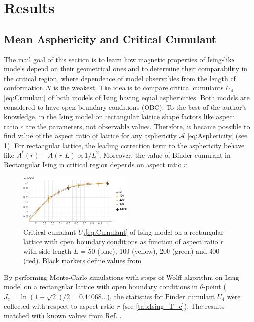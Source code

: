 \section{Results}

\subsection{Mean Asphericity and Critical Cumulant}

The mail goal of this section is to learn how magnetic properties of Ising-like models depend on their geometrical ones and to determine their comparability in the critical region, where dependence of model observables from the length of conformation $N$ is the weakest. 
The idea is to compare critical cumulants $U_{4}$ \eqref{eq:Cumulant} of both models of Ising having equal asphericities. 
Both models are considered to have open boundary conditions (OBC). 
To the best of the author’s knowledge, in the Ising model on rectangular lattice shape factors like aspect ratio $r$ are the parameters, not observable values. 
Therefore, it became possible to find value of the aspect ratio of lattice for any asphericity $\mathcal{A}$ \eqref{eq:Asphericity} (see \cref{fig:A_r}). 
For rectangular lattice, the leading correction term to the asphericity behave like $A^{*}(r) - A(r, L) \propto 1 / L^{2}$. 
Moreover, the value of Binder cumulant in Rectangular Ising in critical region depends on aspect ratio $r$ \cite{Selke2006}.

\begin{figure}[h]
    \centering
    \includegraphics[width=0.5\textwidth]{Images/CumulantOBC.png}
    \caption{Critical cumulant $U_{4}$\eqref{eq:Cumulant} of Ising model on a rectangular lattice with open boundary conditions as function of aspect ratio $r$ with side length $L$ = 50 (blue), 100 (yellow), 200 (green) and 400 (red). Black markers define values from \cite{Selke2006}}
    \label{fig:A_r}
\end{figure} 

By performing Monte-Carlo simulations with steps of Wolff algorithm \cite{Newmanb1999} on Ising model on a rectangular lattice with open boundary conditions in $\theta$-point ($J_{c} = \ln{(1 + \sqrt{2}) / 2} =  0.44068... $), the statistics for Binder cumulant $U_{4}$ were collected with respect to aspect ratio $r$ (see \cref{tab:Ising_T_c}). The results matched with known values from Ref. \cite{Selke2006}.

